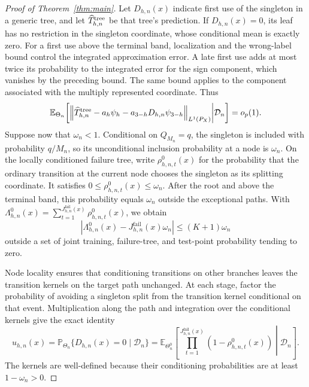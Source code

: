 \documentclass[12pt]{article}
\newcommand{\E}{\mathbb E}
\newcommand{\Prb}{\mathbb P}
\begin{document}
\begin{appendix}
\begin{proof}[Proof of Theorem~\ref{thm:main}]
Let \(D_{h,n}(x)\) indicate first use of the singleton in a generic tree, and let \(\widehat T^{\rm tree}_{h,n}\) be that tree's prediction. If \(D_{h,n}(x)=0\), its leaf has no restriction in the singleton coordinate, whose conditional mean is exactly zero. For a first use above the terminal band, localization and the wrong-label bound control the integrated approximation error. A late first use adds at most twice its probability to the integrated error for the sign component, which vanishes by the preceding bound. The same bound applies to the component associated with the multiply represented coordinate. Thus
\begin{equation}\label{eq:proof-mixture}
\E_{\Theta_n}\!\left[
\left\|\widehat T^{\rm tree}_{h,n}-a_h\psi_h
-a_{3-h}D_{h,n}\psi_{3-h}\right\|_{L^1(P_X)}
\middle|\mathcal D_n\right]=o_p(1).
\end{equation}
Suppose now that \(\omega_n<1\). Conditional on \(Q_{M_n}=q\), the singleton is included with probability \(q/M_n\), so its unconditional inclusion probability at a node is \(\omega_n\). On the locally conditioned failure tree, write \(\rho_{h,n,t}^0(x)\) for the probability that the ordinary transition at the current node chooses the singleton as its splitting coordinate. It satisfies \(0\le\rho_{h,n,t}^0(x)\le\omega_n\). After the root and above the terminal band, this probability equals \(\omega_n\) outside the exceptional paths. With \(\Lambda_{h,n}^0(x)=\sum_{t=1}^{J_{h,n}^{\mathrm{fail}}(x)}\rho_{h,n,t}^0(x)\), we obtain
\begin{equation}\label{eq:proof-hazard}
\left|\Lambda_{h,n}^0(x)-J_{h,n}^{\mathrm{fail}}(x)\omega_n\right|
\le(K+1)\omega_n
\end{equation}
outside a set of joint training, failure-tree, and test-point probability tending to zero.

Node locality ensures that conditioning transitions on other branches leaves the transition kernels on the target path unchanged. At each stage, factor the probability of avoiding a singleton split from the transition kernel conditional on that event. Multiplication along the path and integration over the conditional kernels give the exact identity
\begin{equation}\label{eq:proof-survival}
u_{h,n}(x)=\Prb_{\Theta_n}\{D_{h,n}(x)=0\mid\mathcal D_n\}
=\E_{\Theta_n^0}\!\left[
\prod_{t=1}^{J_{h,n}^{\mathrm{fail}}(x)}(1-\rho_{h,n,t}^0(x))
\middle|\mathcal D_n\right].
\end{equation}
The kernels are well-defined because their conditioning probabilities are at least \(1-\omega_n>0\).


\end{proof}
\end{appendix}
\end{document}
